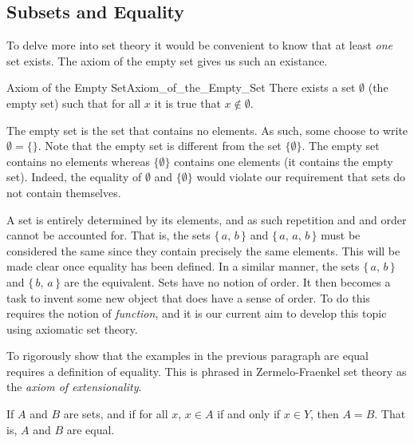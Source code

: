         \subsection{Subsets and Equality}
            To delve more into set theory it would be convenient to know that
            at least \textit{one} set exists. The axiom of the empty set gives
            us such an existance.
            \begin{faxiom}{Axiom of the Empty Set}{Axiom_of_the_Empty_Set}
                There exists a set $\emptyset$ (the empty set) such
                that for all $x$ it is true that $x\notin\emptyset$.
            \end{faxiom}
            The empty set is the set that contains no elements. As such, some
            choose to write $\emptyset=\{\}$. Note that the empty set is
            different from the set $\{\emptyset\}$. The empty set contains no
            elements whereas $\{\emptyset\}$ contains one elements (it
            contains the empty set). Indeed, the equality of $\emptyset$ and
            $\{\emptyset\}$ would violate our requirement that sets do not
            contain themselves.
            \par\hfill\par
            A set is entirely determined by its elements, and as such
            repetition and and order cannot be accounted for. That is, the
            sets $\{\,a,\,b\,\}$ and $\{\,a,\,a,\,b\,\}$ must be considered
            the same since they contain precisely the same elements. This will
            be made clear once equality has been defined. In a similar manner,
            the sets $\{\,a,\,b\,\}$ and $\{\,b,\,a\,\}$ are the equivalent.
            Sets have no notion of order. It then becomes a task to invent
            some new object that does have a sense of order. To do this
            requires the notion of \textit{function}, and it is our current aim
            to develop this topic using axiomatic set theory.
            \par\hfill\par
            To rigorously show that the examples in the previous paragraph are
            equal requires a definition of equality. This is phrased in
            Zermelo-Fraenkel set theory as the \textit{axiom of extensionality}.
            \begin{axiom}
                If $A$ and $B$ are sets, and if for all $x$, $x\in{A}$ if and
                only if $x\in{Y}$, then $A=B$. That is, $A$ and $B$ are equal.
            \end{axiom}
